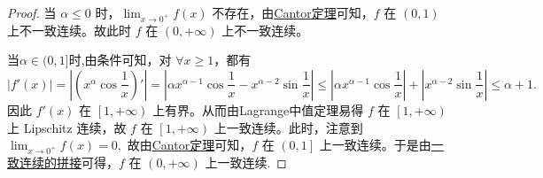 \documentclass[../../main.tex]{subfiles}
\begin{document}
\begin{proof}
当 $\alpha \leqslant 0$ 时，$\lim_{x \rightarrow 0^+} f\left( x \right)$ 不存在，由\hyperref[theorem:Cantor定理]{Cantor定理}可知，$f$ 在 $\left( 0,1 \right)$ 上不一致连续。故此时 $f$ 在 $\left( 0,+\infty \right)$ 上不一致连续。

当$\alpha \in (0,1]$时,由条件可知，对 $\forall x \geqslant 1$，都有
\[
\left| f'\left( x \right) \right| = \left| \left( x^{\alpha} \cos \frac{1}{x} \right)' \right| = \left| \alpha x^{\alpha - 1} \cos \frac{1}{x} - x^{\alpha - 2} \sin \frac{1}{x} \right| \leqslant \left| \alpha x^{\alpha - 1} \cos \frac{1}{x} \right| + \left| x^{\alpha - 2} \sin \frac{1}{x} \right| \leqslant \alpha + 1.
\]
因此 $f'\left( x \right)$ 在 $\left[ 1, +\infty \right)$ 上有界。从而由Lagrange中值定理易得 $f$ 在 $\left[ 1,+\infty \right)$ 上 Lipschitz 连续，故 $f$ 在 $\left[ 1,+\infty \right)$ 上一致连续。此时，注意到
\(
\lim_{x \rightarrow 0^+} f\left( x \right) = 0,
\)
故由\hyperref[theorem:Cantor定理]{Cantor定理}可知，$f$ 在 $\left( 0,1 \right]$ 上一致连续。于是由\hyperref[proposition:一致连续函数的拼接]{一致连续的拼接}可得，$f$ 在 $\left( 0,+\infty \right)$ 上一致连续.


\end{proof}
\end{document}
